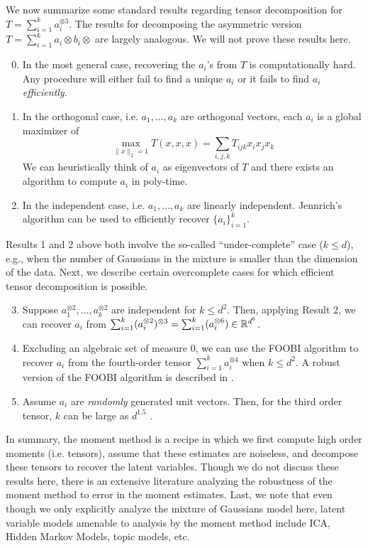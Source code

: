 We now summarize some standard results regarding tensor decomposition for $T = \sum_{i = 1}^k a_i^{\otimes 3}$. The results for decomposing the asymmetric version  $T = \sum_{i = 1}^k a_i\otimes b_i \otimes$ are largely analogous. We will not prove these results here.
\begin{enumerate}
\setcounter{enumi}{-1}
\item  In the most general case, recovering the $a_i$'s from $T$ is computationally hard. Any procedure will either fail to find a unique $a_i$ or it fails to find $a_i$ \emph{efficiently}. 
\item In the orthogonal case, i.e. $a_1,\dots,a_k$ are orthogonal vectors, each $a_i$ is a global maximizer of 
\begin{equation}
    \max_{\|x\|_2 = 1} T(x,x,x) = \sum_{i,j,k} T_{ijk} x_i x_j x_k
\end{equation}
We can heuristically think of $a_i$ as eigenvectors of $T$ and there exists an algorithm to compute $a_i$ in poly-time.
\item In the independent case, i.e. $a_1,\dots,a_k$ are linearly independent. Jennrich's algorithm can be used to efficiently recover $\{a_i\}_{i = 1}^k$.
\end{enumerate} 
Results 1 and 2 above both involve the so-called ``under-complete'' case ($k \leq d$), e.g., when the number of Gaussians in the mixture is smaller than the dimension of the data. Next, we describe certain overcomplete cases for which efficient tensor decomposition is possible.
\begin{enumerate}
\setcounter{enumi}{2}
\item Suppose $a_1^{\otimes2},\dots,a_k^{\otimes2}$ are independent for $k \leq d^2$. Then, applying Result 2, we can recover $a_i$ from $\sum_{i=1}^k (a_i^{\otimes2})^{\otimes3} = \sum_{i=1}^k (a_i^{\otimes6}) \in \mathbb R^{d^6}$.
\item Excluding an algebraic set of measure $0$, we can use the FOOBI algorithm to recover $a_i$ from the fourth-order tensor $\sum_{i = 1}^k a_i^{\otimes 4}$ when $k \leq d^2$. A robust version of the FOOBI algorithm is described in \citet{ma2016poly}.
\item Assume $a_i$ are \emph{randomly} generated unit vectors. Then, for the third order tensor, $k$ can be large as $d^{1.5}$ \cite{ma2016poly, schrammsteurer17}. 
\end{enumerate}

In summary, the moment method is a recipe in which we first compute high order moments (i.e. tensors), assume that these estimates are noiseless, and decompose these tensors to recover the latent variables. Though we do not discuss these results here, there is an extensive literature analyzing the robustness of the moment method to error in the moment estimates. Last, we note that even though we only explicitly analyze the mixture of Gaussians model here, latent variable models amenable to analysis by the moment method include ICA, Hidden Markov Models, topic models, etc.

